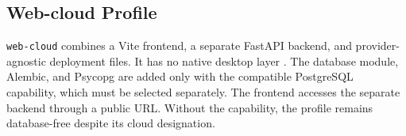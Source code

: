 \subsection{Web-cloud Profile}
\label{subsec:profil-web-cloud}

\texttt{web-cloud} combines a Vite frontend, a separate FastAPI backend, and
provider-agnostic deployment files. It has no native desktop layer
\parencite{kleiveist2026deployment,kleiveist2026profiles}. The database module,
Alembic, and Psycopg are added only with the compatible PostgreSQL capability,
which must be selected separately.
The frontend accesses the separate backend through a public URL. Without the
capability, the profile remains database-free despite its cloud designation.
